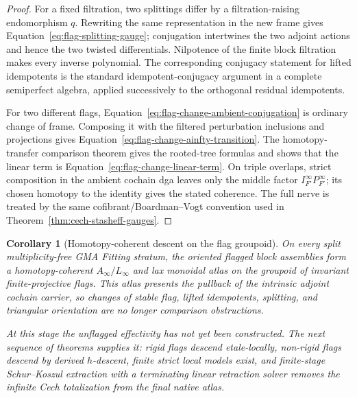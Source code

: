 \documentclass[11pt]{article}
\newtheorem{corollary}[theorem]{Corollary}
\theoremstyle{definition}
\begin{document}
\begin{proof}
For a fixed filtration, two splittings differ by a filtration-raising
endomorphism $q$.  Rewriting the same representation in the new frame gives
Equation~\eqref{eq:flag-splitting-gauge}; conjugation intertwines the two
adjoint actions and hence the two twisted differentials.  Nilpotence of the
finite block filtration makes every inverse polynomial.  The corresponding
conjugacy statement for lifted idempotents is the standard idempotent-conjugacy
argument in a complete semiperfect algebra, applied successively to the
orthogonal residual idempotents.

For two different flags, Equation~\eqref{eq:flag-change-ambient-conjugation} is
ordinary change of frame.  Composing it with the filtered perturbation
inclusions and projections gives Equation~\eqref{eq:flag-change-ainfty-transition}.
The homotopy-transfer comparison theorem gives the rooted-tree formulas and
shows that the linear term is Equation~\eqref{eq:flag-change-linear-term}.
On triple overlaps, strict composition in the ambient cochain dga leaves only
the middle factor $I_{F'}^\infty P_{F'}^\infty$; its chosen homotopy to the
identity gives the stated coherence.  The full nerve is treated by the same
cofibrant/Boardman--Vogt convention used in
Theorem~\ref{thm:cech-stasheff-gauges}.
\end{proof}

\begin{corollary}[Homotopy-coherent descent on the flag groupoid]\label{cor:flag-groupoid-descent}
On every split multiplicity-free GMA Fitting stratum, the oriented flagged
block assemblies form a homotopy-coherent $A_\infty/L_\infty$ and lax
monoidal atlas on the groupoid of invariant finite-projective flags.  This
atlas presents the pullback of the intrinsic adjoint cochain carrier, so
changes of stable flag, lifted idempotents, splitting, and triangular
orientation are no longer comparison obstructions.

At this stage the unflagged effectivity has not yet been constructed.  The
next sequence of theorems supplies it: rigid flags descend etale-locally,
non-rigid flags descend by derived $h$-descent, finite strict local models exist,
and finite-stage Schur--Koszul extraction with a terminating linear retraction
solver removes the infinite Cech totalization from the final native atlas.
\end{corollary}
\end{document}
